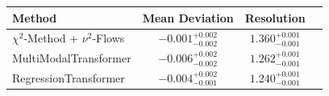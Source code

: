     \begin{tabular}{lccc}
        \toprule
        Method & Mean Deviation & Resolution \\
        \midrule
        $\chi^2$-Method + $\nu^2$-Flows & $-0.001_{-0.002}^{+0.002}$ & $1.360_{-0.001}^{+0.001}$ \\
        MultiModalTransformer & $-0.006_{-0.002}^{+0.002}$ & $1.262_{-0.001}^{+0.001}$ \\
        RegressionTransformer & $-0.004_{-0.001}^{+0.002}$ & $1.240_{-0.001}^{+0.001}$ \\
        \bottomrule
    \end{tabular}